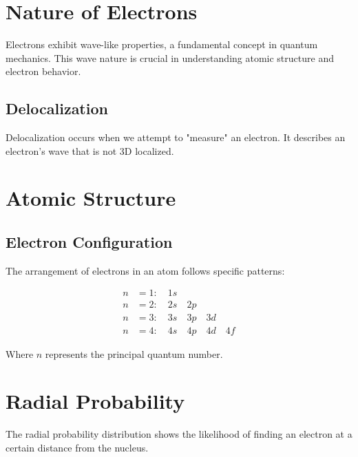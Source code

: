 \documentclass{report}
\begin{document}
\section{Nature of Electrons}

Electrons exhibit wave-like properties, a fundamental concept in quantum mechanics. This wave nature is crucial in understanding atomic structure and electron behavior.

\subsection{Delocalization}

Delocalization occurs when we attempt to "measure" an electron. It describes an electron's wave that is not 3D localized.

\section{Atomic Structure}

\subsection{Electron Configuration}

The arrangement of electrons in an atom follows specific patterns:

\begin{align*}
	n & = 1: \quad 1s                            \\
	n & = 2: \quad 2s \quad 2p                   \\
	n & = 3: \quad 3s \quad 3p \quad 3d          \\
	n & = 4: \quad 4s \quad 4p \quad 4d \quad 4f
\end{align*}

Where $n$ represents the principal quantum number.

\section{Radial Probability}

The radial probability distribution shows the likelihood of finding an electron at a certain distance from the nucleus.

\begin{center}
\end{center}
\end{document}
